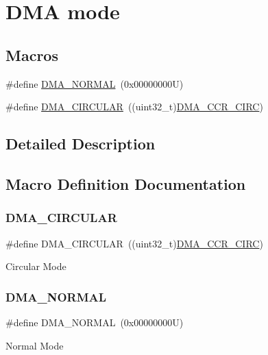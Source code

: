 \hypertarget{group___d_m_a__mode}{}\section{D\+MA mode}
\label{group___d_m_a__mode}
\subsection*{Macros}
\begin{DoxyCompactItemize}
\item 
\#define \hyperlink{group___d_m_a__mode_ga04941acfbbdefc53e1e08133cffa3b8a}{D\+M\+A\+\_\+\+N\+O\+R\+M\+AL}~(0x00000000\+U)
\item 
\#define \hyperlink{group___d_m_a__mode_ga4c4f425cba13edffb3c831c036c91e01}{D\+M\+A\+\_\+\+C\+I\+R\+C\+U\+L\+AR}~((uint32\+\_\+t)\hyperlink{group___peripheral___registers___bits___definition_ga445471396e741418bcd6f63404f4052c}{D\+M\+A\+\_\+\+C\+C\+R\+\_\+\+C\+I\+RC})
\end{DoxyCompactItemize}


\subsection{Detailed Description}


\subsection{Macro Definition Documentation}
\mbox{\label{group___d_m_a__mode_ga4c4f425cba13edffb3c831c036c91e01}} 
\subsubsection{\texorpdfstring{D\+M\+A\+\_\+\+C\+I\+R\+C\+U\+L\+AR}{DMA\_CIRCULAR}}
{\footnotesize\ttfamily \#define D\+M\+A\+\_\+\+C\+I\+R\+C\+U\+L\+AR~((uint32\+\_\+t)\hyperlink{group___peripheral___registers___bits___definition_ga445471396e741418bcd6f63404f4052c}{D\+M\+A\+\_\+\+C\+C\+R\+\_\+\+C\+I\+RC})}

Circular Mode \mbox{\label{group___d_m_a__mode_ga04941acfbbdefc53e1e08133cffa3b8a}} 
\subsubsection{\texorpdfstring{D\+M\+A\+\_\+\+N\+O\+R\+M\+AL}{DMA\_NORMAL}}
{\footnotesize\ttfamily \#define D\+M\+A\+\_\+\+N\+O\+R\+M\+AL~(0x00000000\+U)}

Normal Mode 